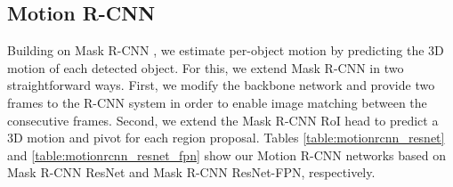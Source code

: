 
\subsection{Motion R-CNN}
\label{ssec:model}

Building on Mask R-CNN \cite{MaskRCNN},
we estimate per-object motion by predicting the 3D motion of each detected object.
For this, we extend Mask R-CNN in two straightforward ways.
First, we modify the backbone network and provide two frames to the R-CNN system
in order to enable image matching between the consecutive frames.
Second, we extend the Mask R-CNN RoI head to predict a 3D motion and pivot for each
region proposal. Tables \ref{table:motionrcnn_resnet} and \ref{table:motionrcnn_resnet_fpn}
show our Motion R-CNN networks based on Mask R-CNN ResNet and Mask R-CNN ResNet-FPN,
respectively.

